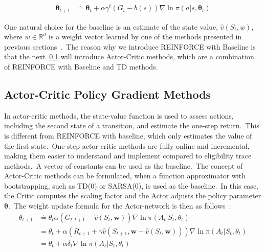 \documentclass[../xlapes02]{subfiles}
\begin{document}
    \begin{equation}
        \label{eq:REINFORCE_with_baseline-final}
        \begin{split}
            \bm{\theta}_{t+1}&\doteq\bm{\theta}_{t}+\alpha\gamma^t (G_t-b(s)) \nabla\ln\pi(a|s,\bm{\theta}_t)
        \end{split}
    \end{equation}

    One natural choice for the baseline is an estimate of the state value, $\hat{v}(S_t, w)$, where $w \in \mathbb{R}^d$ is a weight vector learned by one of the methods presented in previous sections~\cite{FITMT25127, sutton2018reinforcement, rl-course-david-silver}.\ The reason why we introduce REINFORCE with Baseline is that the next~\cref{subsec:actor-critic-policy-gradient-methods} will introduce Actor-Critic methods, which are a combination of REINFORCE with Baseline and TD methods.

    \subsection{Actor-Critic Policy Gradient Methods}\label{subsec:actor-critic-policy-gradient-methods}
    In actor-critic methods, the state-value function is used to assess actions, including the second state of a transition, and estimate the one-step return.\ This is different from REINFORCE with baseline, which only estimates the value of the first state.\ One-step actor-critic methods are fully online and incremental, making them easier to understand and implement compared to eligibility trace methods.\ A vector of constants can be used as the baseline.\ The concept of Actor-Critic methods can be formulated, when a function approximator with bootstrapping, such as TD(0) or SARSA(0), is used as the baseline.\ In this case, the Critic computes the scaling factor and the Actor adjusts the policy parameter $\bm{\theta}$.\ The weight update formula for the Actor-network is then as follows~\cite{sutton2018reinforcement, FITMT25127}:
    \begin{equation}
        \label{eq:actor_critic_policy_gradient_update_formula}
        \begin{split}
            \theta_{t+1}&\doteq\theta_t\alpha\left(G_{t:t+1}-\hat{v}(S_t,\bm{w})\right)\nabla\ln\pi(A_t|S_t,\theta_t)\\
            &=\theta_t+\alpha\left(R_{t+1}+\gamma\hat{v}(S_{t+1},\bm{w}-\hat{v}(S_t,\bm{w}))\right)\nabla\ln\pi(A_t|S_t,\theta_t)\\
            &=\theta_t+\alpha\delta_t\nabla\ln\pi(A_t|S_t,\theta_t)
        \end{split}
    \end{equation}
\end{document}
